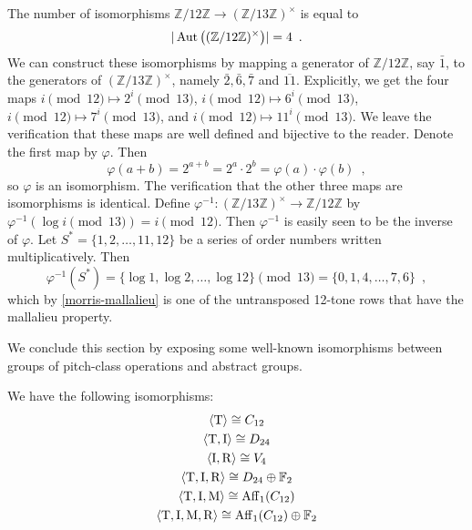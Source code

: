 \begin{example}
	\cite[8]{Lewin1976a}
	\cite[9]{Babbitt1976}
	The number of isomorphisms $\mathbb{Z} / 12 \mathbb{Z} \to (\mathbb{Z} / 13 \mathbb{Z})^\times$ is equal to
	\begin{equation}
		|\operatorname{Aut}\big((\mathbb{Z} / 12 \mathbb{Z})^\times\big)| = 4 \enspace.
	\end{equation}
	We can construct these isomorphisms by mapping a generator of $\mathbb{Z} / 12 \mathbb{Z}$, say $\bar{1}$, to the generators of $(\mathbb{Z} / 13 \mathbb{Z})^\times$, namely $\bar{2}, \bar{6}, \bar{7}$ and $\overline{11}$. Explicitly, we get the four maps $i \pmod{12} \mapsto 2^i \pmod{13}$, $i \pmod{12} \mapsto 6^i \pmod{13}$, $i \pmod{12} \mapsto 7^i \pmod{13}$, and $i \pmod{12} \mapsto 11^i \pmod{13}$. We leave the verification that these maps are well defined and bijective to the reader. Denote the first map by $\varphi$. Then
	\begin{equation}
		\varphi(a + b) = 2^{a + b} = 2^a \cdot 2^b = \varphi(a) \cdot \varphi(b) \enspace,
	\end{equation}
	so $\varphi$ is an isomorphism. The verification that the other three maps are isomorphisms is identical. Define $\varphi^{-1} : (\mathbb{Z} / 13 \mathbb{Z})^\times \to \mathbb{Z} / 12 \mathbb{Z}$ by $\varphi^{-1}(\log i \pmod{13}) = i \pmod{12}$. Then $\varphi^{-1}$ is easily seen to be the inverse of $\varphi$. Let $S^* = \{ 1, 2, \dots, 11, 12 \}$ be a series of order numbers written multiplicatively. Then
	\begin{equation}
		\varphi^{-1}(S^*) = \{ \log 1, \log 2, \dots, \log 12 \} \pmod{13} =
		\{ 0, 1, 4, \dots, 7, 6 \} \enspace,
	\end{equation}
	which by \ref{morris-mallalieu} is one of the untransposed 12-tone rows that have the mallalieu property.
\end{example}

We conclude this section by exposing some well-known isomorphisms between groups of pitch-class operations and abstract groups.

\begin{proposition}
	\cite[127]{FripertingerLackner2015}
	We have the following isomorphisms:
	\begin{gather}
		\langle \operatorname{T} \rangle \cong C_{12} \\
		\langle \operatorname{T}, \operatorname{I} \rangle \cong D_{24} \\
		\langle \operatorname{I}, \operatorname{R} \rangle \cong V_4 \\
		\langle \operatorname{T}, \operatorname{I}, \operatorname{R} \rangle \cong D_{24} \oplus \mathbb{F}_2 \\
		\langle \operatorname{T}, \operatorname{I}, \operatorname{M} \rangle \cong \operatorname{Aff}_1(C_{12}) \\
		\langle \operatorname{T}, \operatorname{I}, \operatorname{M}, \operatorname{R} \rangle \cong \operatorname{Aff}_1(C_{12}) \oplus \mathbb{F}_2
	\end{gather}
\end{proposition}
